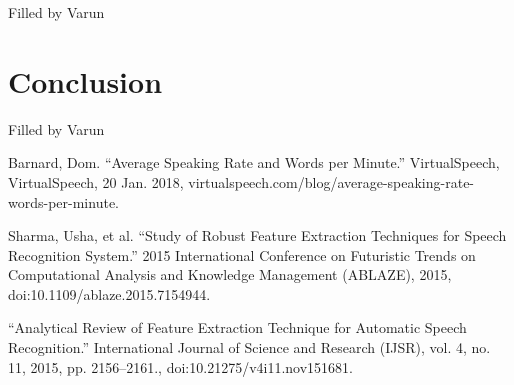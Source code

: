 \documentclass[10pt,twocolumn,letterpaper]{article}
\begin{document}
Filled by Varun


\section{Conclusion}

Filled by Varun



\begin{thebibliography}{1}

      Barnard, Dom. “Average Speaking Rate and Words per Minute.” VirtualSpeech, VirtualSpeech, 20 Jan. 2018, virtualspeech.com/blog/average-speaking-rate-words-per-minute. 
  
      Sharma, Usha, et al. “Study of Robust Feature Extraction Techniques for Speech Recognition System.” 2015 International Conference on Futuristic Trends on Computational Analysis and Knowledge Management (ABLAZE), 2015, doi:10.1109/ablaze.2015.7154944. 
  
    “Analytical Review of Feature Extraction Technique for Automatic Speech Recognition.” International Journal of Science and Research (IJSR), vol. 4, no. 11, 2015, pp. 2156–2161., doi:10.21275/v4i11.nov151681. 
  
  
\end{thebibliography}
\end{document}

